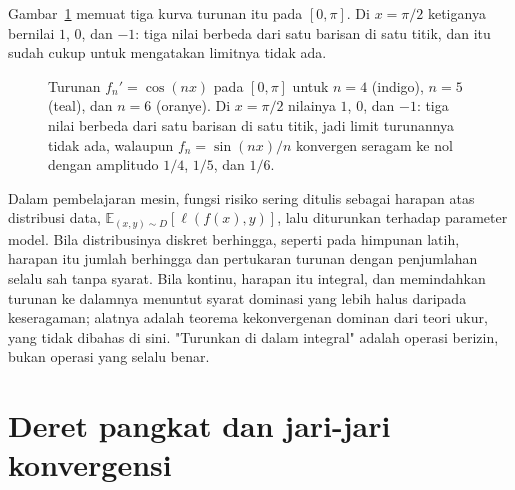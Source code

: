 Gambar~\ref{fig:turunan} memuat tiga kurva turunan itu pada $[0,\pi]$. Di
$x=\pi/2$ ketiganya bernilai $1$, $0$, dan $-1$: tiga nilai berbeda dari satu
barisan di satu titik, dan itu sudah cukup untuk mengatakan limitnya tidak ada.

\begin{figure}[htbp]
\centering
{}
\caption{Turunan $f_n'=\cos(nx)$ pada $[0,\pi]$ untuk $n=4$ (indigo), $n=5$
(teal), dan $n=6$ (oranye). Di $x=\pi/2$ nilainya $1$, $0$, dan $-1$: tiga nilai
berbeda dari satu barisan di satu titik, jadi limit turunannya tidak ada,
walaupun $f_n=\sin(nx)/n$ konvergen seragam ke nol dengan amplitudo $1/4$,
$1/5$, dan $1/6$.}
\label{fig:turunan}
\end{figure}

\begin{catatan}
Dalam pembelajaran mesin, fungsi risiko sering ditulis sebagai harapan atas
distribusi data, $\mathbb{E}_{(x,y)\sim D}[\ell(f(x),y)]$, lalu diturunkan
terhadap parameter model. Bila distribusinya diskret berhingga, seperti pada
himpunan latih, harapan itu jumlah berhingga dan pertukaran turunan dengan
penjumlahan selalu sah tanpa syarat. Bila kontinu, harapan itu integral, dan
memindahkan turunan ke dalamnya menuntut syarat dominasi yang lebih halus
daripada keseragaman; alatnya adalah teorema kekonvergenan dominan dari teori
ukur, yang tidak dibahas di sini. "Turunkan di dalam integral" adalah operasi
berizin, bukan operasi yang selalu benar.
\end{catatan}

\section{Deret pangkat dan jari-jari konvergensi}

